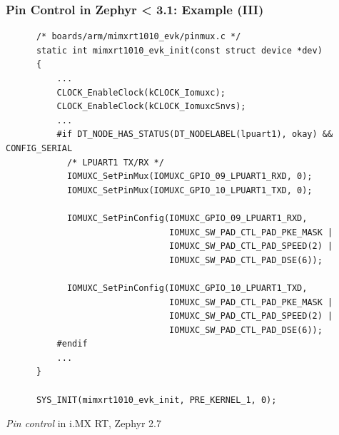 \documentclass[handout]{beamer}
\begin{document}
\begin{frame}[fragile]
  \frametitle{Pin Control in Zephyr < 3.1: Example (III)}

  \begin{listing}[H]
    \begin{verbatim}
      /* boards/arm/mimxrt1010_evk/pinmux.c */
      static int mimxrt1010_evk_init(const struct device *dev)
      {
          ...
          CLOCK_EnableClock(kCLOCK_Iomuxc);
          CLOCK_EnableClock(kCLOCK_IomuxcSnvs);
          ...
          #if DT_NODE_HAS_STATUS(DT_NODELABEL(lpuart1), okay) && CONFIG_SERIAL
            /* LPUART1 TX/RX */
            IOMUXC_SetPinMux(IOMUXC_GPIO_09_LPUART1_RXD, 0);
            IOMUXC_SetPinMux(IOMUXC_GPIO_10_LPUART1_TXD, 0);

            IOMUXC_SetPinConfig(IOMUXC_GPIO_09_LPUART1_RXD,
                                IOMUXC_SW_PAD_CTL_PAD_PKE_MASK |
                                IOMUXC_SW_PAD_CTL_PAD_SPEED(2) |
                                IOMUXC_SW_PAD_CTL_PAD_DSE(6));

            IOMUXC_SetPinConfig(IOMUXC_GPIO_10_LPUART1_TXD,
                                IOMUXC_SW_PAD_CTL_PAD_PKE_MASK |
                                IOMUXC_SW_PAD_CTL_PAD_SPEED(2) |
                                IOMUXC_SW_PAD_CTL_PAD_DSE(6));
          #endif
          ...
      }

      SYS_INIT(mimxrt1010_evk_init, PRE_KERNEL_1, 0);
    \end{verbatim}
    \caption{\textit{Pin control} in i.MX RT, Zephyr 2.7}
  \end{listing}
\end{frame}
\end{document}
